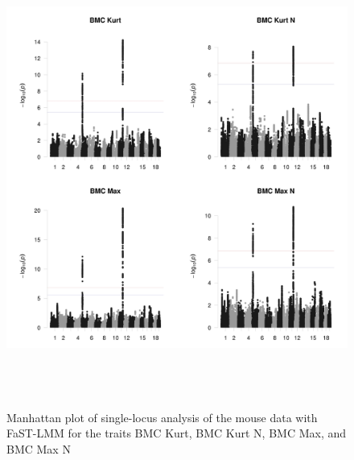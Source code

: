 \documentclass{article}
\begin{document}
\begin{figure}
\caption{Manhattan plot of single-locus analysis of the mouse data with FaST-LMM for the traits BMC Kurt,  BMC Kurt N, BMC Max, and BMC Max N}
\begin{center}
\includegraphics[width=15cm, height=15cm]{1.jpeg}
\end{center}
\end{figure}
\end{document}
